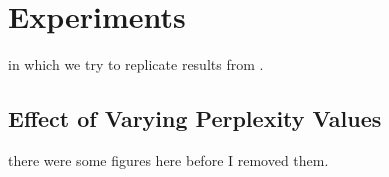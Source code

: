 \chapter{Experiments}\label{chapter:experiments}
in which we try to replicate results from \cite{belkina19}. 

\section{Effect of Varying Perplexity Values}
there were some figures here before I removed them. 